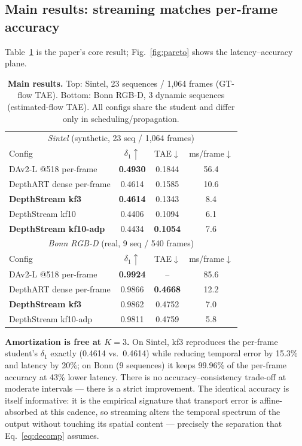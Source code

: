 \documentclass[10pt,twocolumn]{article}
\begin{document}
\subsection{Main results: streaming matches per-frame accuracy}
Table~\ref{tab:main} is the paper's core result; Fig.~\ref{fig:pareto} shows
the latency--accuracy plane.

\begin{table}[t]
\centering\small
\setlength{\tabcolsep}{3.4pt}
\caption{\textbf{Main results.} Top: Sintel, 23 sequences / 1{,}064 frames
(GT-flow TAE). Bottom: Bonn RGB-D, 3 dynamic sequences (estimated-flow TAE).
All configs share the student and differ only in scheduling/propagation.}
\label{tab:main}
\begin{tabular}{lccc}
\toprule
\multicolumn{4}{c}{\emph{Sintel} (synthetic, 23 seq / 1{,}064 frames)}\\
Config & $\delta_1{\uparrow}$ & TAE$\downarrow$ & ms/frame$\downarrow$\\
\midrule
DAv2-L @518 per-frame & \textbf{0.4930} & 0.1844 & 56.4\\
DepthART dense per-frame & 0.4614 & 0.1585 & 10.6\\
\textbf{DepthStream kf3} & \textbf{0.4614} & 0.1343 & 8.4\\
DepthStream kf10 & 0.4406 & 0.1094 & 6.1\\
\textbf{DepthStream kf10-adp} & 0.4434 & \textbf{0.1054} & 7.6\\
\midrule
\multicolumn{4}{c}{\emph{Bonn RGB-D} (real, 9 seq / 540 frames)}\\
Config & $\delta_1{\uparrow}$ & TAE$\downarrow$ & ms/frame$\downarrow$\\
\midrule
DAv2-L @518 per-frame & \textbf{0.9924} & -- & 85.6\\
DepthART dense per-frame & 0.9866 & \textbf{0.4668} & 12.2\\
\textbf{DepthStream kf3} & 0.9862 & 0.4752 & 7.0\\
DepthStream kf10-adp & 0.9811 & 0.4759 & 5.8\\
\bottomrule
\end{tabular}
\end{table}

\textbf{Amortization is free at $K{=}3$.} On Sintel, kf3 reproduces the
per-frame student's $\delta_1$ exactly (0.4614 vs.\ 0.4614) while reducing
temporal error by 15.3\% and latency by 20\%; on Bonn (9 sequences) it keeps
99.96\% of the per-frame accuracy at 43\% lower latency. There is no
accuracy--consistency trade-off at moderate intervals --- there is a strict
improvement. The identical accuracy is itself informative: it is the
empirical signature that transport error is affine-absorbed at this cadence,
so streaming alters the temporal spectrum of the output without touching
its spatial content --- precisely the separation that
Eq.~\ref{eq:decomp} assumes.
\end{document}
